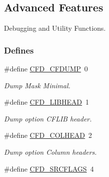 \hypertarget{group__advanced__features}{
\subsection{Advanced Features}
\label{group__advanced__features}
}
Debugging and Utility Functions.  


\subsubsection*{Defines}
\begin{CompactItemize}
\item 
\hypertarget{group__advanced__features_gb28b8410738c00c62003a5f5b2b19827}{
\#define \hyperlink{group__advanced__features_gb28b8410738c00c62003a5f5b2b19827}{CFD\_\-CFDUMP}~0}
\label{group__advanced__features_gb28b8410738c00c62003a5f5b2b19827}

\begin{CompactList}\small\item\em Dump Mask Minimal. \item\end{CompactList}\item 
\hypertarget{group__advanced__features_g6a97e565629fc3e7423e4feb804eb5d0}{
\#define \hyperlink{group__advanced__features_g6a97e565629fc3e7423e4feb804eb5d0}{CFD\_\-LIBHEAD}~1}
\label{group__advanced__features_g6a97e565629fc3e7423e4feb804eb5d0}

\begin{CompactList}\small\item\em Dump option CFLIB header. \item\end{CompactList}\item 
\hypertarget{group__advanced__features_g05403834c7c6377bcf762d640c0d0854}{
\#define \hyperlink{group__advanced__features_g05403834c7c6377bcf762d640c0d0854}{CFD\_\-COLHEAD}~2}
\label{group__advanced__features_g05403834c7c6377bcf762d640c0d0854}

\begin{CompactList}\small\item\em Dump option Column headers. \item\end{CompactList}\item 
\hypertarget{group__advanced__features_g9deeb100c2dc701f8f8193b8fb53fbff}{
\#define \hyperlink{group__advanced__features_g9deeb100c2dc701f8f8193b8fb53fbff}{CFD\_\-SRCFLAGS}~4}
\label{group__advanced__features_g9deeb100c2dc701f8f8193b8fb53fbff}


\end{CompactItemize}
